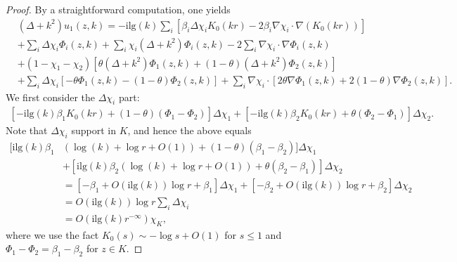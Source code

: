 \documentclass[12pt]{amsart}
\begin{document}
\begin{proof}
By a straightforward computation, one yields
\begin{align*}
    &(\Delta+k^2)u_1(z,k) = -\textrm{ilg}(k) \sum_i \left[\beta_i \Delta \chi_i K_0(kr) - 2 \beta_i \nabla \chi_i \cdot \nabla (K_0(kr))    \right]\\
    &+ \sum_i \Delta \chi_i \Phi_i(z,k) + \sum_i \chi_i (\Delta+k^2) \Phi_i(z,k) - 2 \sum_i \nabla \chi_i \cdot \nabla \Phi_i(z,k)\\
    &+ (1-\chi_1-\chi_2)\left[ \theta (\Delta+k^2)\Phi_1(z,k) + (1-\theta) (\Delta+k^2)\Phi_2(z,k) \right]\\
    &+ \sum_i \Delta \chi_i \left[ -\theta \Phi_1(z,k) - (1-\theta) \Phi_2(z,k) \right] + \sum_i \nabla \chi_i \cdot \left[ 2\theta \nabla \Phi_1(z,k) + 2(1-\theta) \nabla \Phi_2(z,k) \right].
\end{align*}
We first consider the $\Delta \chi_i$ part:
\begin{align*}
    \left[-\textrm{ilg}(k) \beta_1 K_0(kr) + (1-\theta)(\Phi_1-\Phi_2) \right] \Delta \chi_1 + \left[-\textrm{ilg}(k) \beta_2 K_0(kr) + \theta (\Phi_2-\Phi_1) \right] \Delta \chi_2.
\end{align*}
Note that $\Delta \chi_i$ support in $K$, and hence the above equals
\begin{align*}
    \big[\textrm{ilg}(k) \beta_1 &\left( \log(k) + \log{r} + O(1) \right) + (1-\theta)(\beta_1-\beta_2) \big] \Delta \chi_1 \\
    &+ \left[\textrm{ilg}(k) \beta_2 \left( \log(k) + \log{r} + O(1) \right) + \theta (\beta_2-\beta_1) \right] \Delta \chi_2\\
    &= \left[-\beta_1 + O(\textrm{ilg}(k)) \log{r} + \beta_1 \right] \Delta \chi_1 + \left[-\beta_2 + O(\textrm{ilg}(k)) \log{r} + \beta_2 \right] \Delta \chi_2\\
    &= O(\textrm{ilg}(k)) \log{r} \sum_i \Delta \chi_i\\
    &= O(\textrm{ilg}(k) r^{-\infty}) \chi_K,
\end{align*}
where we use the fact $K_0(s) \sim - \log{s} + O(1)$ for $s\le 1$ and $\Phi_1 - \Phi_2 = \beta_1-\beta_2$ for $z\in K$.


\end{proof}
\end{document}
